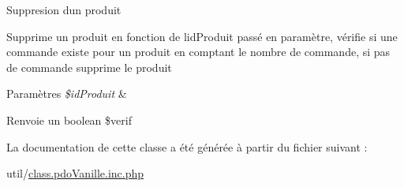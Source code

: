 Suppresion d\textquotesingle{}un produit

Supprime un produit en fonction de l\textquotesingle{}id\+Produit passé en paramètre, vérifie si une commande existe pour un produit en comptant le nombre de commande, si pas de commande supprime le produit


\begin{DoxyParams}{Paramètres}
{\em \$id\+Produit} & \\
\hline
\end{DoxyParams}
\begin{DoxyReturn}{Renvoie}
un boolean \$verif 
\end{DoxyReturn}


La documentation de cette classe a été générée à partir du fichier suivant \+:\begin{DoxyCompactItemize}
\item 
util/\hyperlink{class_8pdo_vanille_8inc_8php}{class.\+pdo\+Vanille.\+inc.\+php}\end{DoxyCompactItemize}

